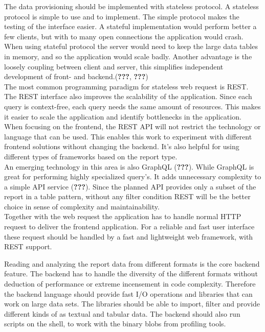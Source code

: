 \documentclass[american,a4paper,oneside,,tablecaptionabove]{scrbook}
\begin{document}
The data provisioning should be implemented with stateless protocol. A
stateless protocol is simple to use and to implement. The simple
protocol makes the testing of the interface easier. A stateful
implementation would perform better a few clients, but with to many open
connections the application would crash. When using stateful protocol
the server would need to keep the large data tables in memory, and so
the application would scale badly. Another advantage is the loosely
coupling between client and server, this simplifies independent
development of front- and backend.({\textbf{???}}, \textbf{???})\\
The most common programming paradigm for stateless web request is REST.
The REST interface also improves the scalability of the application.
Since each query is context-free, each query needs the same amount of
resources. This makes it easier to scale the application and identify
bottlenecks in the application. When focusing on the frontend, the REST
API will not restrict the technology or language that can be used. This
enables this work to experiment with different frontend solutions
without changing the backend. It's also helpful for using different
types of frameworks based on the report type.\\
An emerging technology in this area is also GraphQL ({\textbf{???}}).
While GraphQL is great for performing highly specialized query's. It
adds unnecessary complexity to a simple API service ({\textbf{???}}).
Since the planned API provides only a subset of the report in a table
pattern, without any filter condition REST will be the better choice in
sense of complexity and maintainability.\\
Together with the web request the application has to handle normal HTTP
request to deliver the frontend application. For a reliable and fast
user interface these request should be handled by a fast and lightweight
web framework, with REST support.

Reading and analyzing the report data from different formats is the core
backend feature. The backend has to handle the diversity of the
different formats without deduction of performance or extreme
incensement in code complexity. Therefore the backend language should
provide fast I/O operations and libraries that can work on large data
sets. The libraries should be able to import, filter and provide
different kinds of as textual and tabular data. The backend should also
run scripts on the shell, to work with the binary blobs from profiling
tools.
\end{document}
